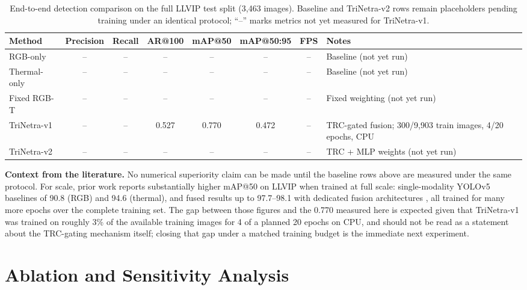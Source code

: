 \documentclass[conference]{IEEEtran}
\begin{document}
\begin{table}[!t]
\centering
\caption{End-to-end detection comparison on the full LLVIP test split (3{,}463 images). Baseline and TriNetra-v2 rows remain placeholders pending training under an identical protocol; ``--'' marks metrics not yet measured for TriNetra-v1.}
\label{tab:mainresults}
\footnotesize
\begin{tabular}{lccccccl}
\toprule
\textbf{Method} & \textbf{Precision} & \textbf{Recall} & \textbf{AR@100} & \textbf{mAP@50} & \textbf{mAP@50:95} & \textbf{FPS} & \textbf{Notes}\\
\midrule
RGB-only & -- & -- & -- & -- & -- & -- & Baseline (not yet run)\\
Thermal-only & -- & -- & -- & -- & -- & -- & Baseline (not yet run)\\
Fixed RGB-T & -- & -- & -- & -- & -- & -- & Fixed weighting (not yet run)\\
TriNetra-v1 & -- & -- & 0.527 & 0.770 & 0.472 & -- & TRC-gated fusion; 300/9{,}903 train images, 4/20 epochs, CPU\\
TriNetra-v2 & -- & -- & -- & -- & -- & -- & TRC + MLP weights (not yet run)\\
\bottomrule
\end{tabular}
\end{table}

\textbf{Context from the literature.} No numerical superiority claim
can be made until the baseline rows above are measured under the same
protocol. For scale, prior work reports substantially higher mAP@50
on LLVIP when trained at full scale: single-modality YOLOv5 baselines
of 90.8 (RGB) and 94.6 (thermal), and fused results up to 97.7--98.1
with dedicated fusion architectures \cite{eef}, all trained for many
more epochs over the complete training set. The gap between those
figures and the 0.770 measured here is expected given that TriNetra-v1
was trained on roughly 3\% of the available training images for 4 of
a planned 20 epochs on CPU, and should not be read as a statement
about the TRC-gating mechanism itself; closing that gap under a
matched training budget is the immediate next experiment.


\section{Ablation and Sensitivity Analysis}
\end{document}
